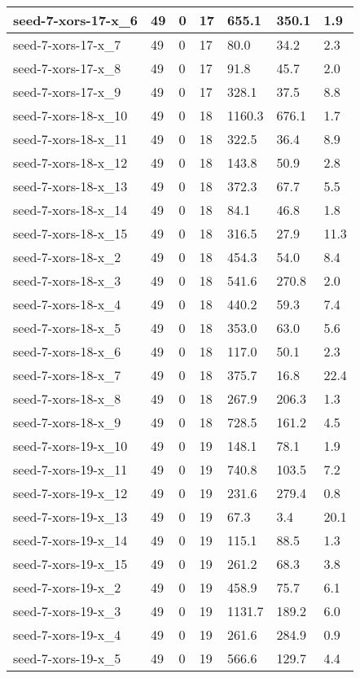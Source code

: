 \begin{scriptsize}
\begin{longtable}{|p{5cm}|l|l|l|l|l|l|}
seed-7-xors-17-x\_6&49&0&17&655.1&350.1&1.9 \\ \hline 
seed-7-xors-17-x\_7&49&0&17&80.0&34.2&2.3 \\ \hline 
seed-7-xors-17-x\_8&49&0&17&91.8&45.7&2.0 \\ \hline 
seed-7-xors-17-x\_9&49&0&17&328.1&37.5&8.8 \\ \hline 
seed-7-xors-18-x\_10&49&0&18&1160.3&676.1&1.7 \\ \hline 
seed-7-xors-18-x\_11&49&0&18&322.5&36.4&8.9 \\ \hline 
seed-7-xors-18-x\_12&49&0&18&143.8&50.9&2.8 \\ \hline 
seed-7-xors-18-x\_13&49&0&18&372.3&67.7&5.5 \\ \hline 
seed-7-xors-18-x\_14&49&0&18&84.1&46.8&1.8 \\ \hline 
seed-7-xors-18-x\_15&49&0&18&316.5&27.9&11.3 \\ \hline 
seed-7-xors-18-x\_2&49&0&18&454.3&54.0&8.4 \\ \hline 
seed-7-xors-18-x\_3&49&0&18&541.6&270.8&2.0 \\ \hline 
seed-7-xors-18-x\_4&49&0&18&440.2&59.3&7.4 \\ \hline 
seed-7-xors-18-x\_5&49&0&18&353.0&63.0&5.6 \\ \hline 
seed-7-xors-18-x\_6&49&0&18&117.0&50.1&2.3 \\ \hline 
seed-7-xors-18-x\_7&49&0&18&375.7&16.8&22.4 \\ \hline 
seed-7-xors-18-x\_8&49&0&18&267.9&206.3&1.3 \\ \hline 
seed-7-xors-18-x\_9&49&0&18&728.5&161.2&4.5 \\ \hline 
seed-7-xors-19-x\_10&49&0&19&148.1&78.1&1.9 \\ \hline 
seed-7-xors-19-x\_11&49&0&19&740.8&103.5&7.2 \\ \hline 
seed-7-xors-19-x\_12&49&0&19&231.6&279.4&0.8 \\ \hline 
seed-7-xors-19-x\_13&49&0&19&67.3&3.4&20.1 \\ \hline 
seed-7-xors-19-x\_14&49&0&19&115.1&88.5&1.3 \\ \hline 
seed-7-xors-19-x\_15&49&0&19&261.2&68.3&3.8 \\ \hline 
seed-7-xors-19-x\_2&49&0&19&458.9&75.7&6.1 \\ \hline 
seed-7-xors-19-x\_3&49&0&19&1131.7&189.2&6.0 \\ \hline 
seed-7-xors-19-x\_4&49&0&19&261.6&284.9&0.9 \\ \hline 
seed-7-xors-19-x\_5&49&0&19&566.6&129.7&4.4 \\ \hline 

\end{longtable}
\end{scriptsize}

